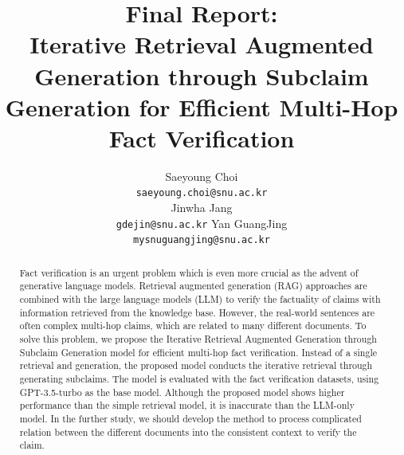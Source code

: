 \documentclass{article}
\title{Final Report: \\ Iterative Retrieval Augmented Generation through Subclaim Generation for Efficient Multi-Hop Fact Verification}
\author{%
  Saeyoung Choi \\
  \texttt{saeyoung.choi@snu.ac.kr} \\
  \And
  Jinwha Jang \\
  \texttt{gdejin@snu.ac.kr}
  \And
  Yan GuangJing \\
  \texttt{mysnuguangjing@snu.ac.kr} \\
}
\begin{document}
\maketitle

\begin{abstract}
    Fact verification is an urgent problem which is even more crucial as the advent of generative language models. Retrieval augmented generation (RAG) approaches are combined with the large language models (LLM) to verify the factuality of claims with information retrieved from the knowledge base. However, the real-world sentences are often complex multi-hop claims, which are related to many different documents. To solve this problem, we propose the Iterative Retrieval Augmented Generation through Subclaim Generation model for efficient multi-hop fact verification. Instead of a single retrieval and generation, the proposed model conducts the iterative retrieval through generating subclaims. The model is evaluated with the fact verification datasets, using GPT-3.5-turbo as the base model. Although the proposed model shows higher performance than the simple retrieval model, it is inaccurate than the LLM-only model. In the further study, we should develop the method to process complicated relation between the different documents into the consistent context to verify the claim.
\end{abstract}
\end{document}
